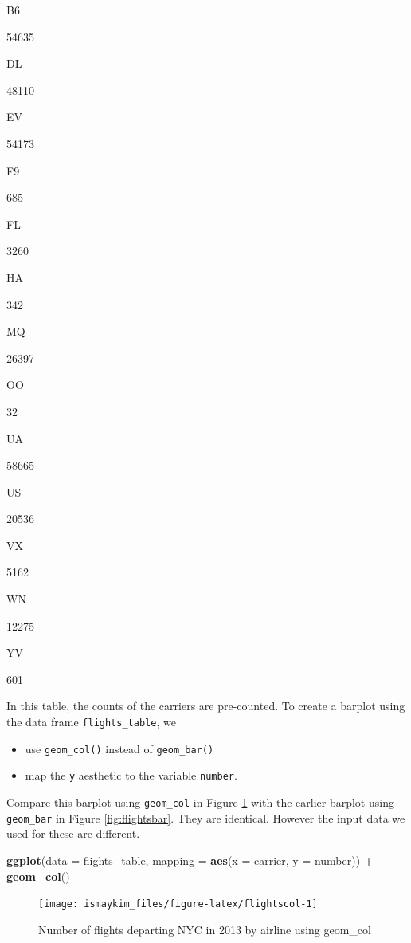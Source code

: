 \documentclass[12pt,]{krantz}
\makeatletter
\newenvironment{Shaded}{\begin{snugshade}}{\end{snugshade}}
\newcommand{\KeywordTok}[1]{\textcolor[rgb]{0.27,0.27,0.27}{\textbf{#1}}}
\newcommand{\DataTypeTok}[1]{\textcolor[rgb]{0.27,0.27,0.27}{#1}}
\newcommand{\StringTok}[1]{\textcolor[rgb]{0.5,0.5,0.5}{#1}}
\newcommand{\OperatorTok}[1]{\textcolor[rgb]{0.43,0.43,0.43}{\textbf{#1}}}
\newcommand{\NormalTok}[1]{#1}
\providecommand{\tightlist}{%
  \setlength{\itemsep}{0pt}\setlength{\parskip}{0pt}}
\newenvironment{kframe}{%
\medskip{}
\setlength{\fboxsep}{.8em}
 \def\at@end@of@kframe{}%
 \ifinner\ifhmode%
  \def\at@end@of@kframe{\end{minipage}}%
  \begin{minipage}{\columnwidth}%
 \fi\fi%
 \def\FrameCommand##1{\hskip\@totalleftmargin \hskip-\fboxsep
 \colorbox{shadecolor}{##1}\hskip-\fboxsep
     \hskip-\linewidth \hskip-\@totalleftmargin \hskip\columnwidth}%
 \MakeFramed {\advance\hsize-\width
   \@totalleftmargin\z@ \linewidth\hsize
   \@setminipage}}%
 {\par\unskip\endMakeFramed%
 \at@end@of@kframe}
\renewenvironment{Shaded}{\begin{kframe}}{\end{kframe}}
\makeatother
\begin{document}
B6

54635

DL

48110

EV

54173

F9

685

FL

3260

HA

342

MQ

26397

OO

32

UA

58665

US

20536

VX

5162

WN

12275

YV

601

In this table, the counts of the carriers are pre-counted. To create a
barplot using the data frame \texttt{flights\_table}, we

\begin{itemize}
\tightlist
\item
  use \texttt{geom\_col()} instead of \texttt{geom\_bar()}
\item
  map the \texttt{y} aesthetic to the variable \texttt{number}.
\end{itemize}

Compare this barplot using \texttt{geom\_col} in Figure
\ref{fig:flightscol} with the earlier barplot using \texttt{geom\_bar}
in Figure \ref{fig:flightsbar}. They are identical. However the input
data we used for these are different.




\begin{Shaded}
\begin{Highlighting}[]
\KeywordTok{ggplot}\NormalTok{(}\DataTypeTok{data =}\NormalTok{ flights_table, }\DataTypeTok{mapping =} \KeywordTok{aes}\NormalTok{(}\DataTypeTok{x =}\NormalTok{ carrier, }\DataTypeTok{y =}\NormalTok{ number)) }\OperatorTok{+}
\StringTok{  }\KeywordTok{geom_col}\NormalTok{()}
\end{Highlighting}
\end{Shaded}

\begin{figure}

{\centering \texttt{[image: ismaykim\_files/figure-latex/flightscol-1]} 

}

\caption{Number of flights departing NYC in 2013 by airline using
geom\_col}\label{fig:flightscol}
\end{figure}
\end{document}
